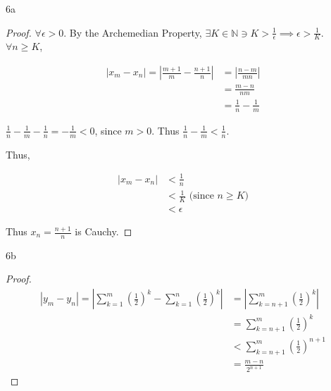 \documentclass{article}
\newcommand{\N}{\mathbb{N}}
\newcommand{\abs}[1]{\left\lvert#1\right\rvert}
\begin{document}
\begin{PROB}{6a}\label{Problem 6a.}
\end{PROB}
\begin{proof}
    $\forall \epsilon > 0$. By the Archemedian Property, $\exists K \in \N \ni K > \frac{1}{\epsilon} \implies \epsilon > \frac{1}{K}$. $\forall n \geq K$,    
    
    \begin{align*}
        \abs{x_m - x_n} = \abs{\frac{m + 1}{m} - \frac{n + 1}{n}} &= \abs{\frac{n - m}{mn}} \\
        &= \frac{m - n}{nm} \\
        &= \frac{1}{n} - \frac{1}{m}  
    \end{align*}

    $\frac{1}{n} - \frac{1}{m} - \frac{1}{n} = -\frac{1}{m} < 0$, since $m > 0$. Thus $\frac{1}{n} - \frac{1}{m} < \frac{1}{n}$.
    
    Thus, 

    \begin{align*}
        \abs{x_m - x_n} &< \frac{1}{n} \\
        &< \frac{1}{K} \text{ (since $n \geq K$)} \\
        &< \epsilon 
    \end{align*}

    Thus $x_n = \frac{n + 1}{n}$ is Cauchy. 
\end{proof}

\begin{PROB}{6b}\label{Problem 6b.}
\end{PROB}
\begin{proof}
    \begin{align*}
        \abs{y_{m} - y_n} = \abs{\sum_{k = 1}^{m}\left(\frac{1}{2}\right)^k - \sum_{k = 1}^{n}\left(\frac{1}{2}\right)^k} &= \abs{\sum_{k = n + 1}^{m} \left(\frac{1}{2}\right)^k} \\
        &= \sum_{k = n + 1}^{m} \left(\frac{1}{2}\right)^k \\
        &< \sum_{k = n + 1}^{m} \left(\frac{1}{2}\right)^{n + 1} \\
        &= \frac{m - n}{2^{n + 1}}
    \end{align*}
\end{proof}
\end{document}
